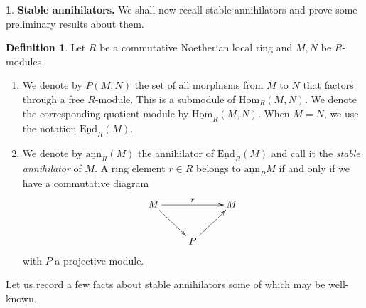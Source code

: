 \documentclass[12pt]{amsart}
\newcommand{\Hom}{\mathrm{Hom}}
\newcommand{\sHom}{\underline{\mathrm{Hom}}}
\newcommand{\sEnd}{\underline{\mathrm{End}}}
\newcommand{\sann}{\underline{\mathrm{ann}}}
\theoremstyle{definition}
\newtheorem{definition}[theorem]{Definition}
\newtheorem{chunk}[theorem]{}
\numberwithin{equation}{theorem}
\begin{document}
\begin{chunk}
    \textbf{Stable annihilators.} We shall now recall stable annihilators and prove some preliminary results about them.
    \begin{definition}\label{stable-annihilator-definitions}
        Let $R$ be a commutative Noetherian local ring and $M, N$ be $R$-modules.
        \begin{enumerate}
            \item We denote by $P(M,N)$ the set of all morphisms from $M$ to $N$ that factors through a free $R$-module. This is a submodule of $\Hom_R(M,N)$. We denote the corresponding quotient module by $\sHom_R(M,N)$. When $M = N$, we use the notation $\sEnd_R(M)$.
            \item We denote by $\sann_R(M)$ the annihilator of $\sEnd_R(M)$ and call it the \textit{stable annihilator} of $M$. A ring element $r \in R$ belongs to $\sann_R M$ if and only if we have a commutative diagram
            \begin{align*}
                \xymatrix{
                M \ar^{r}[rr] \ar[dr]  && M \\
                &P \ar[ur]&
                }
            \end{align*}
            with $P$ a projective module.
        \end{enumerate}
        \end{definition}

        Let us record a few facts about stable annihilators some of which may be well-known.


\end{chunk}
\end{document}
